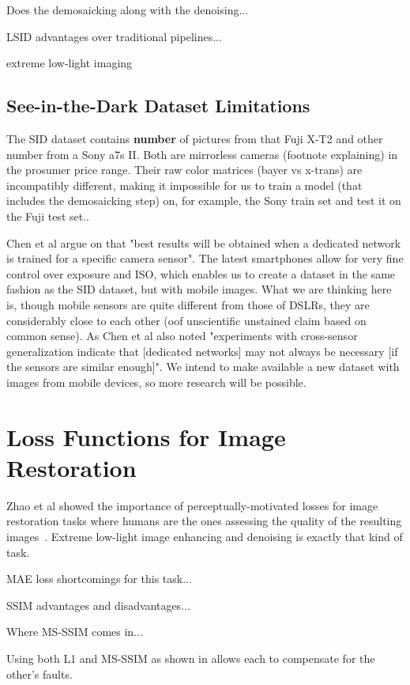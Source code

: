 Does the demosaicking along with the denoising...

LSID advantages over traditional pipelines...

extreme low-light imaging

\subsection{See-in-the-Dark Dataset Limitations}
The SID dataset contains \textbf{number} of pictures from that Fuji X-T2 and other number from a Sony a7s II.
Both are mirrorless cameras (footnote explaining) in the prosumer price range.
Their raw color matrices (bayer vs x-trans) are incompatibly different, making it impossible for us to train a model (that includes the demosaicking step) on, for example, the Sony train set and test it on the Fuji test set..

Chen et al argue on \cite{DBLP:conf/cvpr/ChenCXK18:lsid} that "best results will be obtained when a dedicated network is trained for a specific camera sensor".
The latest smartphones allow for very fine control over exposure and ISO, which enables us to create a dataset in the same fashion as the SID dataset, but with mobile images.
What we are thinking here is, though mobile sensors are quite different from those of DSLRs, they are considerably close to each other (oof unscientific unstained claim based on common sense).
As Chen et al also noted "experiments with cross-sensor generalization indicate that [dedicated networks] may not always be necessary [if the sensors are similar enough]".
We intend to make available a new dataset with images from mobile devices, so more research will be possible.

\section{Loss Functions for Image Restoration}
Zhao et al showed the importance of perceptually-motivated losses for image restoration tasks where humans are the ones assessing the quality of the resulting images~\cite{DBLP:journals/tci/ZhaoGFK17:l1ssimloss}.
Extreme low-light image enhancing and denoising is exactly that kind of task.

MAE loss shortcomings for this task...

SSIM advantages and disadvantages...

Where MS-SSIM comes in...

Using both L1 and MS-SSIM as shown in \cite{DBLP:journals/tci/ZhaoGFK17:l1ssimloss} allows each to compensate for the other's faults.

